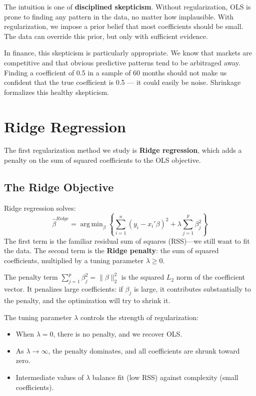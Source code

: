 \documentclass[11pt,a4paper]{article}
\DeclareMathOperator*{\argmin}{arg\,min}
\newcommand{\keyword}[1]{\textbf{\textcolor{AccentOrange}{#1}}}
\begin{document}
The intuition is one of \keyword{disciplined skepticism}. Without regularization, OLS is prone to finding any pattern in the data, no matter how implausible. With regularization, we impose a prior belief that most coefficients should be small. The data can override this prior, but only with sufficient evidence.

In finance, this skepticism is particularly appropriate. We know that markets are competitive and that obvious predictive patterns tend to be arbitraged away. Finding a coefficient of 0.5 in a sample of 60 months should not make us confident that the true coefficient is 0.5 — it could easily be noise. Shrinkage formalizes this healthy skepticism.

\section{Ridge Regression}

The first regularization method we study is \keyword{Ridge regression}, which adds a penalty on the sum of squared coefficients to the OLS objective.

\subsection{The Ridge Objective}

Ridge regression solves:
\[
\widehat{\beta}^{Ridge} = \argmin_\beta \left\{ \sum_{i=1}^n (y_i - x_i'\beta)^2 + \lambda \sum_{j=1}^p \beta_j^2 \right\}
\]
The first term is the familiar residual sum of squares (RSS)---we still want to fit the data. The second term is the \keyword{Ridge penalty}: the sum of squared coefficients, multiplied by a tuning parameter $\lambda \geq 0$.

The penalty term $\sum_{j=1}^p \beta_j^2 = \|\beta\|_2^2$ is the squared $L_2$ norm of the coefficient vector. It penalizes large coefficients: if $\beta_j$ is large, it contributes substantially to the penalty, and the optimization will try to shrink it.

The tuning parameter $\lambda$ controls the strength of regularization:
\begin{itemize}
    \item When $\lambda = 0$, there is no penalty, and we recover OLS.
    \item As $\lambda \to \infty$, the penalty dominates, and all coefficients are shrunk toward zero.
    \item Intermediate values of $\lambda$ balance fit (low RSS) against complexity (small coefficients).
\end{itemize}
\end{document}
